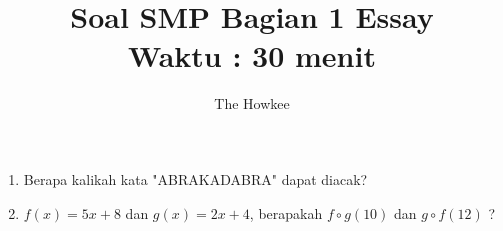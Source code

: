 \documentclass[12pt,a4paper]{article}
\author{The Howkee}
\title{Soal SMP Bagian 1 Essay\\ Waktu : 30 menit}
\begin{document}
	\maketitle
	\begin{enumerate}
		\item Berapa kalikah kata "ABRAKADABRA" dapat diacak?
		\item $f(x)=5x+8$ dan $g(x)=2x+4$, berapakah $f \circ g(10)$ dan $g \circ f(12)$ ?
	\end{enumerate}
	
\end{document}
